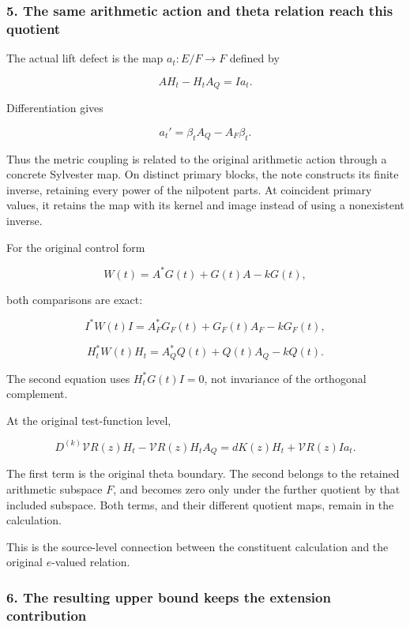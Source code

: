\subsubsection{5. The same arithmetic action and theta relation reach this quotient}\label{endpoint-exponential_constituent_original--the-same-arithmetic-action-and-theta-relation-reach-this-quotient}

The actual lift defect is the map \(a_t:E/F\to F\) defined by

\[
\boxed{
AH_t-H_tA_Q=Ia_t.
}
\]

Differentiation gives

\[
\boxed{
a_t'=\beta_tA_Q-A_F\beta_t.
}
\]

Thus the metric coupling is related to the original arithmetic action through a concrete Sylvester map. On distinct primary blocks, the note constructs its finite inverse, retaining every power of the nilpotent parts. At coincident primary values, it retains the map with its kernel and image instead of using a nonexistent inverse.

For the original control form

\[
W(t)=A^*G(t)+G(t)A-kG(t),
\]

both comparisons are exact:

\[
\boxed{
I^*W(t)I
=
A_F^*G_F(t)+G_F(t)A_F-kG_F(t),
}
\]

\[
\boxed{
H_t^*W(t)H_t
=
A_Q^*Q(t)+Q(t)A_Q-kQ(t).
}
\]

The second equation uses \(H_t^*G(t)I=0\), not invariance of the orthogonal complement.

At the original test-function level,

\[
\boxed{
D^{(k)}\mathcal VR(z)H_t
-\mathcal VR(z)H_tA_Q
=
dK(z)H_t+\mathcal VR(z)Ia_t.
}
\]

The first term is the original theta boundary. The second belongs to the retained arithmetic subspace \(F\), and becomes zero only under the further quotient by that included subspace. Both terms, and their different quotient maps, remain in the calculation.

This is the source-level connection between the constituent calculation and the original \(e\)-valued relation.

\subsubsection{6. The resulting upper bound keeps the extension contribution}\label{endpoint-exponential_constituent_original--the-resulting-upper-bound-keeps-the-extension-contribution}

